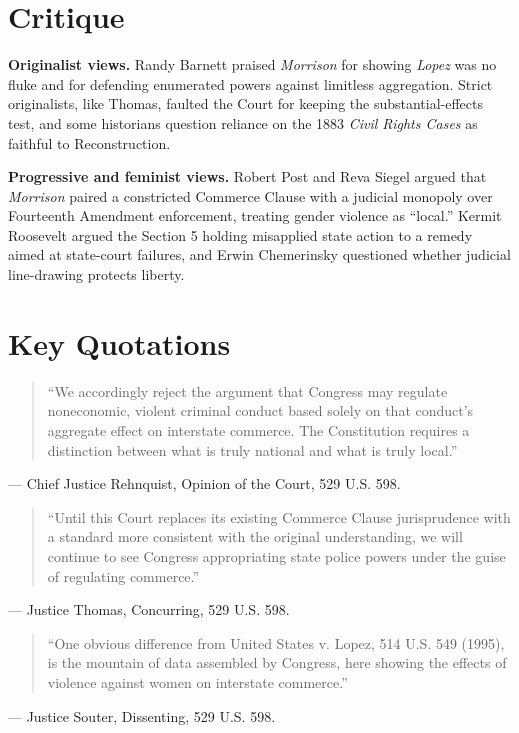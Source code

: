 \documentclass[12pt]{article}
\begin{document}
\section{Critique}

\textbf{Originalist views.} Randy Barnett praised \textit{Morrison} for showing \textit{Lopez} was no fluke and for defending enumerated powers against limitless aggregation. Strict originalists, like Thomas, faulted the Court for keeping the substantial-effects test, and some historians question reliance on the 1883 \textit{Civil Rights Cases} as faithful to Reconstruction.

\textbf{Progressive and feminist views.} Robert Post and Reva Siegel argued that \textit{Morrison} paired a constricted Commerce Clause with a judicial monopoly over Fourteenth Amendment enforcement, treating gender violence as ``local.'' Kermit Roosevelt argued the Section 5 holding misapplied state action to a remedy aimed at state-court failures, and Erwin Chemerinsky questioned whether judicial line-drawing protects liberty.

\section{Key Quotations}

\begin{quote}
``We accordingly reject the argument that Congress may regulate noneconomic, violent criminal conduct based solely on that conduct's aggregate effect on interstate commerce. The Constitution requires a distinction between what is truly national and what is truly local.''
\end{quote}
\noindent --- Chief Justice Rehnquist, Opinion of the Court, 529 U.S. 598.

\begin{quote}
``Until this Court replaces its existing Commerce Clause jurisprudence with a standard more consistent with the original understanding, we will continue to see Congress appropriating state police powers under the guise of regulating commerce.''
\end{quote}
\noindent --- Justice Thomas, Concurring, 529 U.S. 598.

\begin{quote}
``One obvious difference from United States v. Lopez, 514 U.S. 549 (1995), is the mountain of data assembled by Congress, here showing the effects of violence against women on interstate commerce.''
\end{quote}
\noindent --- Justice Souter, Dissenting, 529 U.S. 598.
\end{document}
